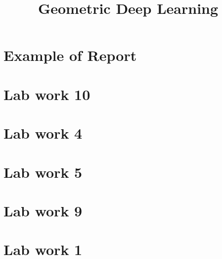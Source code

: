 \documentclass[a4paper,14pt]{article}
\title{Geometric Deep Learning}
\date{}
\numberwithin{equation}{section}
\begin{document}
    \maketitle
    \tableofcontents

    \clearpage
    \section{Example of Report} %
    {} %

    \clearpage
    \section{Lab work 10} %
    {} %

    \clearpage
    \section{Lab work 4} %
    {} %

    \clearpage
    \section{Lab work 5} %
    {} %

    \clearpage
    \section{Lab work 9} %
    {} %

    \clearpage
    \section{Lab work 1} %
    {} %


    \clearpage
    \printbibliography
\end{document}
